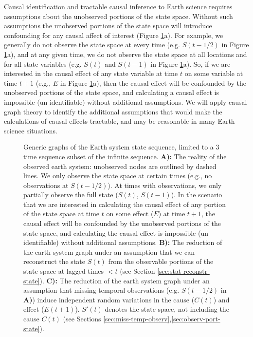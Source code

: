 \documentclass[12pt]{article}
\begin{document}
Causal identification and tractable causal inference to Earth science
requires assumptions about the unobserved portions of the state
space. Without such assumptions the unobserved portions of the state
space will introduce confounding for any causal affect of interest
(Figure \ref{fig:generic}a). For example, we generally do not observe
the state space at every time (e.g. $S(t-1/2)$ in Figure
\ref{fig:generic}a), and at any given time, we do not observe the
state space at all locations and for all state variables (e.g. $S(t)$
and $S(t-1)$ in Figure \ref{fig:generic}a). So, if we are interested
in the causal effect of any state variable at time $t$ on some
variable at time $t+1$ (e.g., $E$ in Figure \ref{fig:generic}a), then
the causal effect will be confounded by the unobserved portions of the
state space, and calculating a causal effect is impossible
(un-identifiable) without additional assumptions. We will apply causal
graph theory to identify the additional assumptions that would make
the calculations of causal effects tractable, and may be reasonable in
many Earth science situations.

\begin{figure}
  
  \caption{Generic graphs of the Earth system state sequence, limited
    to a 3 time sequence subset of the infinite sequence. \textbf{A):}
    The reality of the observed earth system: unobserved nodes are
    outlined by dashed lines. We only observe the state space at
    certain times (e.g., no observations at $S(t-1/2)$). At times with
    observations, we only partially observe the full state ($S(t)$,
    $S(t-1)$). In the scenario that we are interested in calculating
    the causal effect of any portion of the state space at time $t$ on
    some effect ($E$) at time $t+1$, the causal effect will be
    confounded by the unobserved portions of the state space, and
    calculating the causal effect is impossible (un-identifiable)
    without additional assumptions. \textbf{B):} The reduction of the
    earth system graph under an assumption that we can reconstruct the
    state $S(t)$ from the observable portions of the state space at
    lagged times $< t$ (see Section
    \ref{sec:stat-reconstr-state}). \textbf{C):} The reduction of the
    earth system graph under an assumption that missing temporal
    observations (e.g. $S(t-1/2)$ in \textbf{A)}) induce independent
    random variations in the cause ($C(t)$) and effect
    ($E(t+1)$). $S'(t)$ denotes the state space, not including the
    cause $C(t)$ (see Sections
    \ref{sec:miss-temp-observ},\ref{sec:observ-port-state}).}
  \label{fig:generic}
\end{figure}
\end{document}

